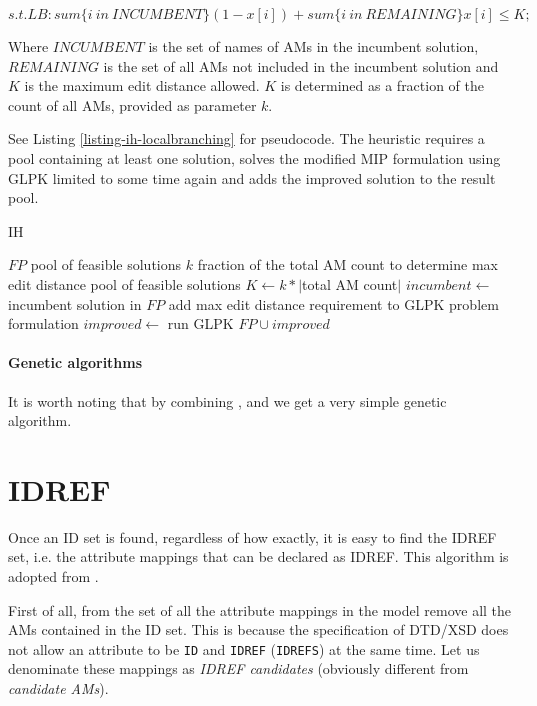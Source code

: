 \[s.t. LB: sum\{i\ in\ INCUMBENT\} (1 - x[i]) + sum\{i\ in\ REMAINING\} x[i] \leq K;\]

Where $INCUMBENT$ is the set of names of AMs in the incumbent solution, $REMAINING$ is the set of all AMs not included in the incumbent solution and $K$ is the maximum edit distance allowed. $K$ is determined as a fraction of the count of all AMs, provided as parameter $k$.

See Listing \ref{listing-ih-localbranching} for pseudocode. The heuristic requires a pool containing at least one solution, solves the modified MIP formulation using GLPK limited to some time again and adds the improved solution to the result pool.\\

\begin{algorithm}
\caption{ IH}
\label{listing-ih-localbranching}
\begin{algorithmic}
\REQUIRE $FP$ pool of feasible solutions
\REQUIRE $k$ fraction of the total AM count to determine max edit distance
\ENSURE pool of feasible solutions
\STATE $K \gets k * |$total AM count$|$
\STATE $incumbent \gets $ incumbent solution in $FP$
\STATE add max edit distance requirement to GLPK problem formulation
\STATE $improved \gets $ run GLPK
\RETURN $FP \cup improved$
\end{algorithmic}
\end{algorithm}

\paragraph{Genetic algorithms}

It is worth noting that by combining ,  and  we get a very simple genetic algorithm.

\section{IDREF}

Once an ID set is found, regardless of how exactly, it is easy to find the IDREF set, i.e. the attribute mappings that can be declared as IDREF. This algorithm is adopted from \cite{fidax}.

First of all, from the set of all the attribute mappings in the model remove all the AMs contained in the ID set. This is because the specification of DTD/XSD does not allow an attribute to be \texttt{ID} and \texttt{IDREF} (\texttt{IDREFS}) at the same time. Let us denominate these mappings as \textit{IDREF candidates} (obviously different from \textit{candidate AMs}).

